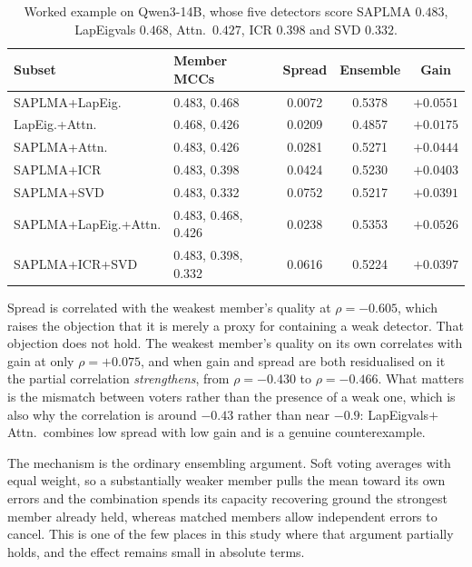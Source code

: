 \begin{table}[h]\centering\footnotesize
  \caption{Worked example on Qwen3-14B, whose five detectors score SAPLMA $0.483$,
  LapEigvals $0.468$, Attn.\ $0.427$, ICR $0.398$ and SVD $0.332$.}
  \begin{tabular}{l l c c c}
    \hline
    Subset & Member MCCs & Spread & Ensemble & Gain \\
    \hline
    SAPLMA+LapEig. & 0.483, 0.468 & 0.0072 & 0.5378 & $+0.0551$ \\
    LapEig.+Attn. & 0.468, 0.426 & 0.0209 & 0.4857 & $+0.0175$ \\
    SAPLMA+Attn. & 0.483, 0.426 & 0.0281 & 0.5271 & $+0.0444$ \\
    SAPLMA+ICR & 0.483, 0.398 & 0.0424 & 0.5230 & $+0.0403$ \\
    SAPLMA+SVD & 0.483, 0.332 & 0.0752 & 0.5217 & $+0.0391$ \\
    SAPLMA+LapEig.+Attn. & 0.483, 0.468, 0.426 & 0.0238 & 0.5353 & $+0.0526$ \\
    SAPLMA+ICR+SVD & 0.483, 0.398, 0.332 & 0.0616 & 0.5224 & $+0.0397$ \\
    \hline\end{tabular}\end{table}

Spread is correlated with the weakest member's quality at $\rho =
-0.605$, which raises the objection that it is merely a proxy
for containing a weak detector. That objection does not hold. The weakest member's quality
on its own correlates with gain at only $\rho = +0.075$, and when
gain and spread are both residualised on it the partial correlation \emph{strengthens},
from $\rho = -0.430$ to $\rho =
-0.466$. What matters is the mismatch
between voters rather than the presence of a weak one, which is also why the correlation is
around $-0.43$ rather than near $-0.9$: LapEigvals$+$Attn.\ combines low spread with low
gain and is a genuine counterexample.

The mechanism is the ordinary ensembling argument. Soft voting averages with equal weight,
so a substantially weaker member pulls the mean toward its own errors and the combination
spends its capacity recovering ground the strongest member already held, whereas matched
members allow independent errors to cancel. This is one of the few places in this study
where that argument partially holds, and the effect remains small in absolute terms.
